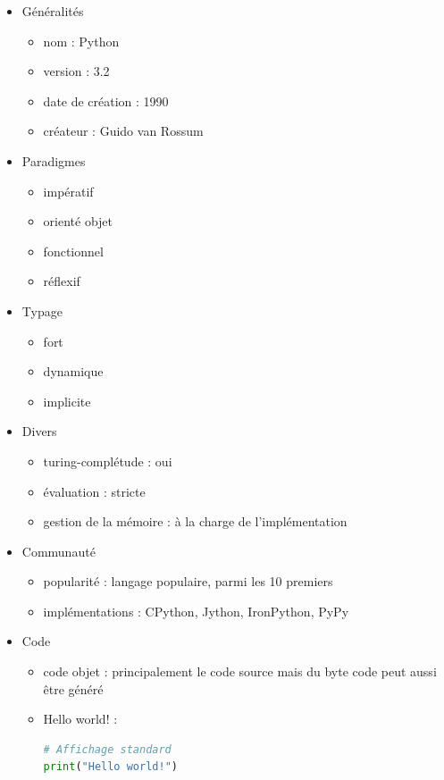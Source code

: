 \renewcommand{\labelitemi}{\textbullet}
\begin{itemize}
\item Généralités
	\begin{itemize}
	\item nom : Python
	\item version : 3.2
	\item date de création : 1990
	\item créateur : Guido van Rossum\\
	\end{itemize}
\item Paradigmes
	\begin{itemize}
	\item impératif
	\item orienté objet
	\item fonctionnel
	\item réflexif\\
	\end{itemize}
\item Typage
	\begin{itemize}
	\item fort
	\item dynamique
	\item implicite\\
	\end{itemize}
\item Divers
	\begin{itemize}
	\item turing-complétude : oui
	\item évaluation : stricte
	\item gestion de la mémoire : à la charge de l'implémentation\\
	\end{itemize}
\item Communauté
	\begin{itemize}
	\item popularité : langage populaire, parmi les 10 premiers
	\item implémentations : CPython, Jython, IronPython, PyPy\\
	\end{itemize}
\item Code
	\begin{itemize}
	\item code objet : principalement le code source mais du byte code peut aussi être généré
	\item Hello world! :
\begin{lstlisting}[language=python]
# Affichage standard
print("Hello world!")
\end{lstlisting}
	\end{itemize}
\end{itemize}